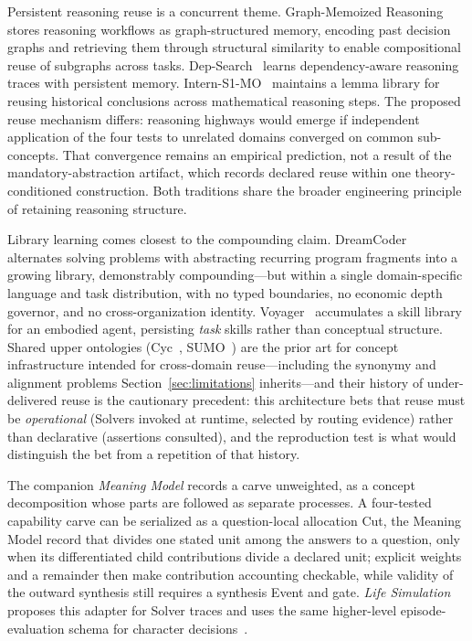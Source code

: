 \documentclass[11pt]{article}
\begin{document}
Persistent reasoning reuse is a concurrent theme. Graph-Memoized Reasoning~\cite{singh2025graphmemoized} stores reasoning workflows as graph-structured memory, encoding past decision graphs and retrieving them through structural similarity to enable compositional reuse of subgraphs across tasks. Dep-Search~\cite{liu2026depsearch} learns dependency-aware reasoning traces with persistent memory. Intern-S1-MO~\cite{gao2025interns1mo} maintains a lemma library for reusing historical conclusions across mathematical reasoning steps. The proposed reuse mechanism differs: reasoning highways would emerge if independent application of the four tests to unrelated domains converged on common sub-concepts. That convergence remains an empirical prediction, not a result of the mandatory-abstraction artifact, which records declared reuse within one theory-conditioned construction. Both traditions share the broader engineering principle of retaining reasoning structure.

Library learning comes closest to the compounding claim. DreamCoder~\cite{ellis2021dreamcoder} alternates solving problems with abstracting recurring program fragments into a growing library, demonstrably compounding---but within a single domain-specific language and task distribution, with no typed boundaries, no economic depth governor, and no cross-organization identity. Voyager~\cite{wang2023voyager} accumulates a skill library for an embodied agent, persisting \emph{task} skills rather than conceptual structure. Shared upper ontologies (Cyc~\cite{lenat1995cyc}, SUMO~\cite{niles2001sumo}) are the prior art for concept infrastructure intended for cross-domain reuse---including the synonymy and alignment problems Section~\ref{sec:limitations} inherits---and their history of under-delivered reuse is the cautionary precedent: this architecture bets that reuse must be \emph{operational} (Solvers invoked at runtime, selected by routing evidence) rather than declarative (assertions consulted), and the reproduction test is what would distinguish the bet from a repetition of that history.

The companion \emph{Meaning Model} records a carve unweighted, as a concept decomposition whose parts are followed as separate processes. A four-tested capability carve can be serialized as a question-local allocation Cut, the Meaning Model record that divides one stated unit among the answers to a question, only when its differentiated child contributions divide a declared unit; explicit weights and a remainder then make contribution accounting checkable, while validity of the outward synthesis still requires a synthesis Event and gate. \emph{Life Simulation} proposes this adapter for Solver traces and uses the same higher-level episode-evaluation schema for character decisions~\cite{westerberg2026meaningmodel,westerberg2026lifesimulation}.
\end{document}
